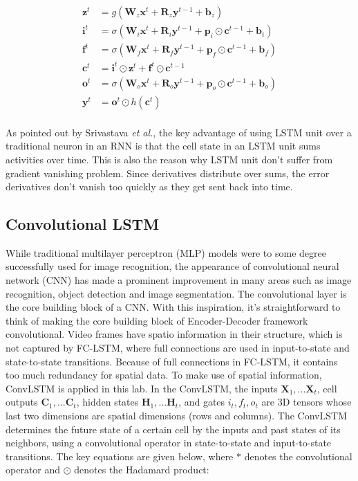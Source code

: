 \documentclass[twoside,a4paper,article]{combine}
\begin{document}
\begin{align*}
    \mathbf{z}^t &= g(\mathbf{W}_z\mathbf{x}^t + \mathbf{R}_z\mathbf{y}^{t-1} + \mathbf{b}_z) \\
    \mathbf{i}^t &= \sigma(\mathbf{W}_i\mathbf{x}^t + \mathbf{R}_i\mathbf{y}^{t-1} + \mathbf{p}_i\odot\mathbf{c}^{t-1}+ \mathbf{b}_i) \\
    \mathbf{f}^t &= \sigma(\mathbf{W}_f\mathbf{x}^t + \mathbf{R}_f\mathbf{y}^{t-1} + \mathbf{p}_f\odot\mathbf{c}^{t-1}+ \mathbf{b}_f) \\
    \mathbf{c}^t &= \mathbf{i}^t\odot\mathbf{z}^t + \mathbf{f}^t\odot\mathbf{c}^{t-1} \\
    \mathbf{o}^t &= \sigma(\mathbf{W}_o\mathbf{x}^t + \mathbf{R}_o\mathbf{y}^{t-1} + \mathbf{p}_o\odot\mathbf{c}^{t-1}+ \mathbf{b}_o) \\
    \mathbf{y}^t &= \mathbf{o}^t \odot h(\mathbf{c}^t) \\
\end{align*}

As pointed out by Srivastava \emph{et al.}, the key advantage of using LSTM unit over a traditional neuron in an RNN is that the cell state
in an LSTM unit sums activities over time. This is also the reason why LSTM unit don't suffer from gradient vanishing problem. Since
derivatives distribute over sums, the error derivatives don't vanish too quickly as they get sent back into time.

\subsection{Convolutional LSTM}
While traditional multilayer perceptron (MLP) models were to some degree successfully used for image recognition, the appearance of
convolutional neural network (CNN) has made a prominent improvement in many areas such as image recognition, object detection and image
segmentation. The convolutional layer is the core building block of a CNN. With this inspiration, it's straightforward to think of making
the core building block of Encoder-Decoder framework convolutional.
Video frames have spatio information in their structure, which is not captured by FC-LSTM, where full connections are used in
input-to-state and state-to-state transitions. Because of full connections in FC-LSTM, it contains too much redundancy for spatial data.
To make use of spatial information, ConvLSTM is applied in this lab. In the ConvLSTM, the
inputs $\bm{X}_1,...\bm{X}_t$, cell outputs $\bm{C}_1,...\bm{C}_t$, hidden states $\bm{H}_1,...\bm{H}_t$, and gates $i_t,f_t,o_t$ are 3D
tensors whose last two dimensions are spatial dimensions (rows and columns). The ConvLSTM determines the future state of a certain cell
by the inputs and past states of its neighbors, using a convolutional operator in state-to-state and input-to-state transitions. The key
equations are given below, where $\ast$ denotes the convolutional operator and $\odot$ denotes the Hadamard product:
\end{document}
